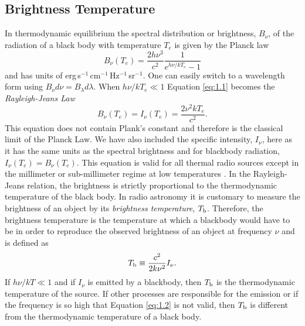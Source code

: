 \subsection{Brightness Temperature}\label{sec:1.8.1}
In thermodynamic equilibrium the spectral distribution or brightness, $B_{\nu}$, of the radiation of a black body with temperature $T_{e}$ is given by the Planck law
\begin{equation}\label{eq:1.1}
B_{\nu}(T_{e})=\frac{2h\nu ^3}{c^2}\frac{1}{e^{h\nu /kT_{e}}-1}
\end{equation}
and has units of erg\,s$^{-1}$\,cm$^{-1}$\,Hz$^{-1}$\,sr$^{-1}$. One can easily switch to a wavelength form using  $B_{\nu}d\nu = B_{\lambda}d\lambda$. When $h\nu /kT_{e} \ll 1$ Equation \ref{eq:1.1} becomes the \textit{Rayleigh-Jeans Law}
\begin{equation}
\label{eq:1.2}
B_{\nu}(T_{e})=I_{\nu}(T_{e})=\dfrac{2\nu ^2kT_{e}}{c^2}.
\end{equation}
This equation does not contain Plank's constant and therefore is the classical limit of the Planck Law. We have also included the specific intensity, $I_{\nu}$, here as it has the same units as the spectral brightness and for blackbody radiation, $I_{\nu}(T_{e}) = B_{\nu}(T_{e})$. This equation is valid for all thermal radio sources except in the millimeter or sub-millimeter regime at low temperatures \citep{rohlfs_1996}. In the Rayleigh-Jeans relation, the brightness is strictly proportional to the thermodynamic temperature of the black body. In radio astronomy it is customary to measure the brightness of an object by its \textit{brightness temperature}, $T_{\rm{b}}$. Therefore, the brightness temperature is the temperature at which a blackbody would have to be in order to reproduce the observed brightness of an object at frequency $\nu$ and is defined as
\begin{equation}\label{eq:1.3}
T_{\rm{b}}\equiv \frac{c^2}{2k\nu ^2}I_{\nu}. 
\end{equation}
If $h\nu /kT \ll 1$ and if $I_{\nu}$ is emitted by a blackbody, then $T_{\rm{b}}$ is the thermodynamic temperature of the source. If other processes are responsible for the emission or if the frequency is so high that Equation \ref{eq:1.2} is not valid, then $T_{\rm{b}}$ is different from the thermodynamic temperature of a black body.

